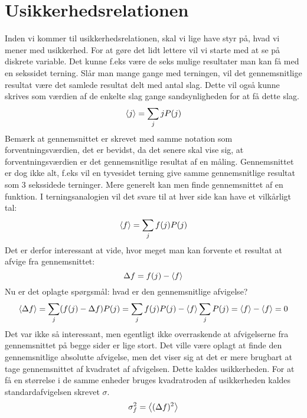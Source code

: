 \documentclass[../Kvantemekanik.tex]{subfiles}
\begin{document}
\section{Usikkerhedsrelationen}

Inden vi kommer til usikkerhedsrelationen, skal vi lige have styr på, hvad vi mener med usikkerhed.
For at gøre det lidt lettere vil vi starte med at se på diskrete variable. Det kunne f.eks være de seks mulige resultater man kan få med en sekssidet terning.
Slår man mange gange med terningen, vil det gennemsnitlige resultat være det samlede resultat delt med antal slag.
Dette vil også kunne skrives som værdien af de enkelte slag gange sandsynligheden for at få dette slag.
\begin{equation}
    \left< j \right> =\sum_j jP(j)
\end{equation}
Bemærk at gennemsnittet er skrevet med samme notation som forventningsværdien, det er bevidst, da det senere skal vise sig, at forventningsværdien er det gennemsnitlige resultat af en måling. Gennemsnittet er dog ikke alt, f.eks vil en tyvesidet terning give samme gennemsnitlige resultat som 3 sekssidede terninger.
Mere generelt kan men finde gennemsnittet af en funktion. I terningsanalogien vil det svare til at hver side kan have et vilkårligt tal:
\begin{equation}
    \left< f \right> = \sum_jf(j)P(j)
\end{equation}
Det er derfor interessant at vide, hvor meget man kan forvente et resultat at afvige fra gennemsnittet:
\begin{equation}
    \Delta f = f(j)- \left< f \right>
\end{equation}
Nu er det oplagte spørgsmål: hvad er den gennemsnitlige afvigelse?
\begin{equation}
    \left< \Delta f \right> = \sum_j(f(j)-\Delta f)P(j) = \sum_jf(j)P(j)-\left< f \right>\sum_jP(j) = \left< f \right>-\left< f \right> = 0
\end{equation}
Det var ikke så interessant, men egentligt ikke overraskende at afvigelserne fra gennemsnittet på begge sider er lige stort.
Det ville være oplagt at finde den gennemsnitlige absolutte afvigelse, men det viser sig at det er mere brugbart at tage gennemsnittet af kvadratet af afvigelsen. Dette kaldes usikkerheden. For at få en størrelse i de samme enheder bruges kvadratroden af usikkerheden kaldes standardafvigelsen skrevet $\sigma$.
\begin{equation}
    \sigma_f^2 = \left< (\Delta f)^2 \right>
    \label{kvant:eq:usikkerheddef}
\end{equation}
\end{document}
